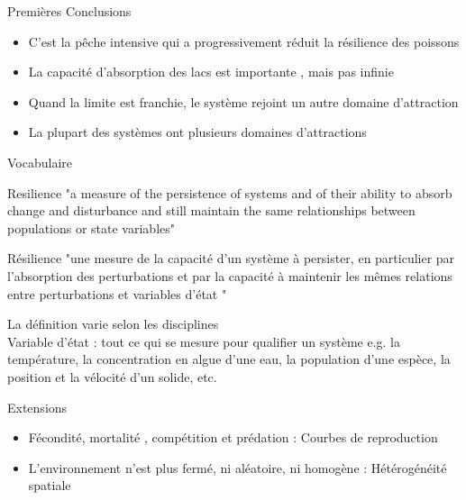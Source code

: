 \documentclass[11,aspectratio=1610]{beamer}
\begin{document}
\begin{frame}{Premières Conclusions}

\begin{itemize}
\item C'est la pêche intensive qui a progressivement réduit la  \alert{résilience} des poissons
\item La capacité d'absorption des lacs est importante , mais pas infinie
\item Quand la limite est franchie, le système  rejoint un autre domaine d'attraction
\item La plupart des systèmes ont plusieurs domaines d'attractions
\end{itemize}

\end{frame}


\begin{frame}{Vocabulaire}


\begin{block}{\alert{Resilience}}  "a measure of the \alert{persistence} of systems and of their \alert{ability to absorb change} and disturbance and still \alert{maintain
the same relationships} between populations or state variables"
\end{block}

\vfill
\begin{block}{\alert{Résilience}}  "une mesure de la capacité d'un système à \alert{persister}, en particulier par l'\alert{absorption} des perturbations et par la capacité à  \alert{maintenir les mêmes relations} entre perturbations et variables d'état "
\end{block}


\vfill


\tiny{La définition varie selon les disciplines}\\
\tiny{Variable d'état : tout ce qui se mesure pour qualifier un système e.g. la température, la concentration en algue d'une eau, la population d'une espèce, la position et la vélocité d'un solide, etc.}



\end{frame}





\begin{frame}{Extensions}



\begin{small}
\begin{itemize}
  \item Fécondité, mortalité , compétition et prédation : \alert{Courbes de reproduction }
  \item  L'environnement n'est plus fermé, ni aléatoire, ni homogène : \alert{Hétérogénéité spatiale} 
  \end{itemize}


\end{small}
  
\end{frame}
\end{document}
